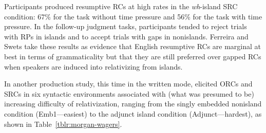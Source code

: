 \noindent Participants produced resumptive RCs at high rates in the \textit{wh}-island SRC condition: 67\% for the task without time pressure and 56\% for the task with time pressure. In the follow-up judgment tasks, participants tended to reject trials with RPs in islands and to accept trials with gaps in nonislands. Ferreira and Swets take these results as evidence that English resumptive RCs are marginal at best in terms of grammaticality but that they are still preferred over gapped RCs when speakers are induced into relativizing from islands.

In another production study, this time in the written mode, \textcite{morgan.wagers2018} elicited ORCs and SRCs in six syntactic environments associated with (what was presumed to be) increasing difficulty of relativization, ranging from the singly embedded nonisland condition (Emb1---easiest) to the adjunct island condition (Adjunct---hardest), as shown in Table~\ref{tblr:morgan-wagers}.

